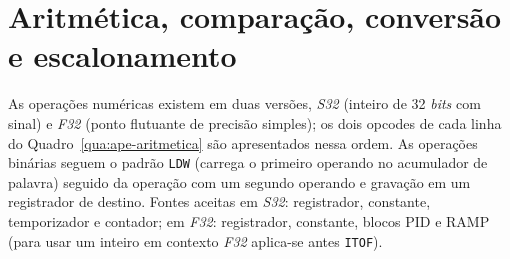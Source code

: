 \section{Aritmética, comparação, conversão e escalonamento}
\label{sec:ape-isa-num}

As operações numéricas existem em duas versões, \textit{S32} (inteiro de 32 \textit{bits} com sinal) e \textit{F32} (ponto flutuante de precisão simples); os dois opcodes de cada linha do Quadro~\ref{qua:ape-aritmetica} são apresentados nessa ordem.
As operações binárias seguem o padrão \texttt{LDW} (carrega o primeiro operando no acumulador de palavra) seguido da operação com um segundo operando e gravação em um registrador de destino.
Fontes aceitas em \textit{S32}: registrador, constante, temporizador e contador; em \textit{F32}: registrador, constante, blocos PID e RAMP (para usar um inteiro em contexto \textit{F32} aplica-se antes \texttt{ITOF}).

